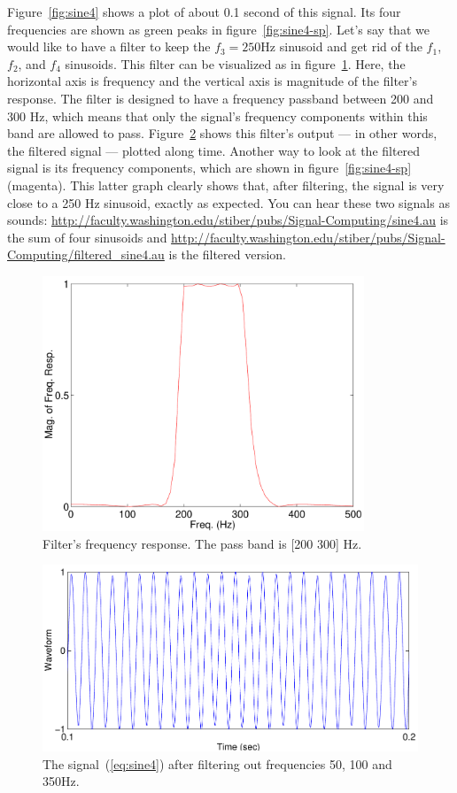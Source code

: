 Figure~\ref{fig:sine4} shows a plot of about 0.1 second of this
signal. Its four frequencies are shown as green peaks in
figure~\ref{fig:sine4-sp}.  Let's say that we would like to have a
filter to keep the $f_3=250$Hz sinusoid and get rid of the $f_1$,
$f_2$, and $f_4$ sinusoids. This filter can be visualized as in
figure~\ref{fig:sine4-band}. Here, the horizontal axis is frequency
and the vertical axis is magnitude of the filter's response. The
filter is designed to have a frequency passband between 200 and 300
Hz, which means that only the signal's frequency components within
this band are allowed to pass. Figure~\ref{fig:sine4-f2} shows this
filter's output --- in other words, the filtered signal --- plotted
along time. Another way to look at the filtered signal is its
frequency components, which are shown in figure~\ref{fig:sine4-sp}
(magenta). This latter graph clearly shows that, after filtering, the
signal is very close to a 250 Hz sinusoid, exactly as expected.  You
can hear these two signals as sounds:
\url{http://faculty.washington.edu/stiber/pubs/Signal-Computing/sine4.au}
is the sum of four sinusoids and
\url{http://faculty.washington.edu/stiber/pubs/Signal-Computing/filtered_sine4.au}
is the filtered version.   

\begin{figure}
\centerline{\includegraphics[height=3in]{ch-fir/sine4_band200-300}}
\caption[Filter frequency response]{Filter's frequency response. The
pass band is [200 300] Hz.\label{fig:sine4-band}}
\end{figure}

\begin{figure}
\centerline{\includegraphics[width=5in]{ch-fir/sine4_filted}}
\caption[A filtered signal]{The signal~(\protect\ref{eq:sine4}) after filtering out
frequencies 50, 100 and 350Hz.\label{fig:sine4-f2}}
\end{figure}

